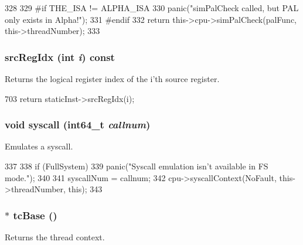 \begin{DoxyCode}
328 {
329 #if THE_ISA != ALPHA_ISA
330     panic("simPalCheck called, but PAL only exists in Alpha!\n");
331 #endif
332     return this->cpu->simPalCheck(palFunc, this->threadNumber);
333 }
\end{DoxyCode}
\hypertarget{classInOrderDynInst_a9353aea3dfe673b88a4a96163d58759f}{
\subsubsection[{srcRegIdx}]{ srcRegIdx (int {\em i}) const}}
\label{classInOrderDynInst_a9353aea3dfe673b88a4a96163d58759f}
Returns the logical register index of the i'th source register. 


\begin{DoxyCode}
703 { return staticInst->srcRegIdx(i); }
\end{DoxyCode}
\hypertarget{classInOrderDynInst_a36e0b96120fcbbc2ee8699158f7be5c2}{
\subsubsection[{syscall}]{\setlength{\rightskip}{0pt plus 5cm}void syscall (int64\_\-t {\em callnum})}}
\label{classInOrderDynInst_a36e0b96120fcbbc2ee8699158f7be5c2}
Emulates a syscall. 


\begin{DoxyCode}
337 {
338     if (FullSystem)
339         panic("Syscall emulation isn't available in FS mode.\n");
340 
341     syscallNum = callnum;
342     cpu->syscallContext(NoFault, this->threadNumber, this);
343 }
\end{DoxyCode}
\hypertarget{classInOrderDynInst_ad33756f3e96ee445dca8d69b1dd8709c}{
\subsubsection[{tcBase}]{$\ast$ tcBase ()}}
\label{classInOrderDynInst_ad33756f3e96ee445dca8d69b1dd8709c}
Returns the thread context. 


